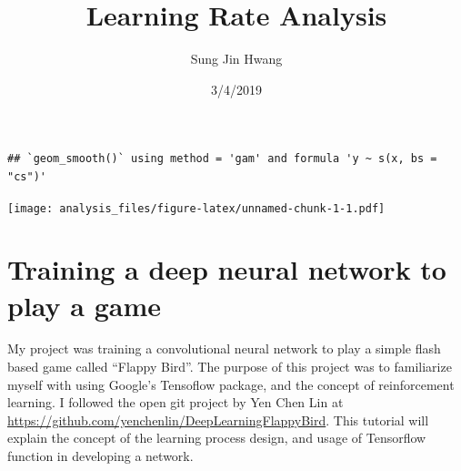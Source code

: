 \documentclass[]{article}
\title{Learning Rate Analysis}
\author{Sung Jin Hwang}
\date{3/4/2019}
\newenvironment{Shaded}{\begin{snugshade}}{\end{snugshade}}
\newcommand{\KeywordTok}[1]{\textcolor[rgb]{0.13,0.29,0.53}{\textbf{#1}}}
\newcommand{\DataTypeTok}[1]{\textcolor[rgb]{0.13,0.29,0.53}{#1}}
\newcommand{\DecValTok}[1]{\textcolor[rgb]{0.00,0.00,0.81}{#1}}
\newcommand{\FloatTok}[1]{\textcolor[rgb]{0.00,0.00,0.81}{#1}}
\newcommand{\StringTok}[1]{\textcolor[rgb]{0.31,0.60,0.02}{#1}}
\newcommand{\OtherTok}[1]{\textcolor[rgb]{0.56,0.35,0.01}{#1}}
\newcommand{\OperatorTok}[1]{\textcolor[rgb]{0.81,0.36,0.00}{\textbf{#1}}}
\newcommand{\NormalTok}[1]{#1}
\begin{document}
\maketitle

\begin{Shaded}
\end{Shaded}

\begin{verbatim}
## `geom_smooth()` using method = 'gam' and formula 'y ~ s(x, bs = "cs")'
\end{verbatim}

\texttt{[image: analysis\_files/figure-latex/unnamed-chunk-1-1.pdf]}

\section{Training a deep neural network to play a
game}\label{training-a-deep-neural-network-to-play-a-game}

My project was training a convolutional neural network to play a simple
flash based game called ``Flappy Bird''. The purpose of this project was
to familiarize myself with using Google's Tensoflow package, and the
concept of reinforcement learning. I followed the open git project by
Yen Chen Lin at
\url{https://github.com/yenchenlin/DeepLearningFlappyBird}. This
tutorial will explain the concept of the learning process design, and
usage of Tensorflow function in developing a network.
\end{document}
